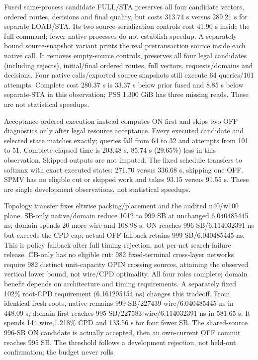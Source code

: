 \documentclass[conference,10pt]{IEEEtran}
\begin{document}
Fused same-process candidate FULL/STA preserves all four candidate vectors, ordered routes, decisions and final quality, but costs 313.74 s versus 289.21 s for separate LOAD/STA. Its two source-serialization controls cost 41.90 s inside the full command; fewer native processes do not establish speedup. A separately bound source-snapshot variant prints the real pretransaction source inside each native call. It removes empty-source controls, preserves all four legal candidates (including rejects), initial/final ordered routes, full vectors, requests/domains and decisions. Four native calls/exported source snapshots still execute 64 queries/101 attempts. Complete cost 280.37 s is 33.37 s below prior fused and 8.85 s below separate-STA in this observation; PSS 1.300 GiB has three missing reads. These are not statistical speedups.

Acceptance-ordered execution instead computes ON first and skips two OFF diagnostics only after legal resource acceptance. Every executed candidate and selected state matches exactly; queries fall from 64 to 32 and attempts from 101 to 51. Complete elapsed time is 203.48 s, 85.74 s (29.65\%) less in this observation. Skipped outputs are not imputed. The fixed schedule transfers to softmax with exact executed states: 271.70 versus 336.68 s, skipping one OFF. SPMV has no eligible cut or skipped work and takes 93.15 versus 91.55 s. These are single development observations, not statistical speedups.

Topology transfer fixes eltwise packing/placement and the audited n40/w100 plane. SB-only native/domain reduce 1012 to 999 SB at unchanged 6.040485445 ns; domain spends 20 more wire and 108.98 s. ON reaches 996 SB/6.114032391 ns but exceeds the CPD cap; actual OFF fallback retains 999 SB/6.040485445 ns. This is policy fallback after full timing rejection, not per-net search-failure release. CB-only has no eligible cut: 982 fixed-terminal cross-layer networks require 982 distinct unit-capacity OPIN crossing sources, attaining the observed vertical lower bound, not wire/CPD optimality. All four roles complete; domain benefit depends on architecture and timing requirements. A separately fixed 102\% root-CPD requirement (6.161295154 ns) changes this tradeoff. From identical fresh roots, native remains 999 SB/227439 wire/6.040485445 ns in 448.09 s; domain-first reaches 995 SB/227583 wire/6.114032391 ns in 581.65 s. It spends 144 wire,1.218\% CPD and 133.56 s for four fewer SB. The shared-source 996-SB ON candidate is actually accepted, then an own-current OFF commit reaches 995 SB. The threshold follows a development rejection, not held-out confirmation; the budget never rolls.
\end{document}
